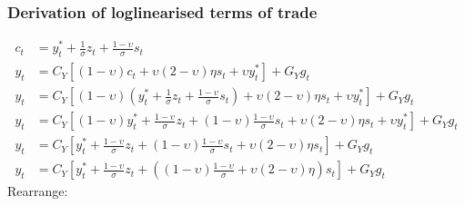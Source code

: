 \subsubsection*{Derivation of loglinearised terms of trade}
\begin{align} \label{eq:terms_of_trade_derivation_beginning}
    c_t & = y^*_t + \frac{1}{\sigma}z_t + \frac{1-\upsilon}{\sigma}s_t\\
    y_t &= C_Y\left[(1-\upsilon)c_t + \upsilon (2-\upsilon)\eta s_t + \upsilon y^*_t\right] + G_Y g_t\\
    y_t &= C_Y\left[(1-\upsilon)\left( y^*_t + \frac{1}{\sigma}z_t + \frac{1-\upsilon}{\sigma}s_t \right) + \upsilon (2-\upsilon)\eta s_t + \upsilon y^*_t\right] + G_Y g_t\\
    y_t &= C_Y\left[(1-\upsilon)y^*_t + \frac{1-\upsilon}{\sigma}z_t + (1-\upsilon)\frac{1-\upsilon}{\sigma}s_t + \upsilon (2-\upsilon)\eta s_t + \upsilon y^*_t\right] + G_Y g_t\\
    y_t &= C_Y\left[y^*_t + \frac{1-\upsilon}{\sigma}z_t + (1-\upsilon)\frac{1-\upsilon}{\sigma}s_t + \upsilon (2-\upsilon)\eta s_t\right] + G_Y g_t\\
    y_t &= C_Y\left[y^*_t + \frac{1-\upsilon}{\sigma}z_t + \left((1-\upsilon)\frac{1-\upsilon}{\sigma} + \upsilon (2-\upsilon)\eta \right) s_t\right] + G_Y g_t
\end{align} 
Rearrange:
